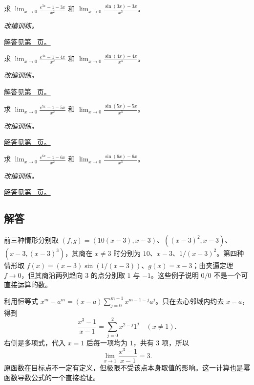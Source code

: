 \documentclass[UTF8,12pt,a4paper,fontset=fandol]{ctexart}
\begin{document}
\begin{example}[消去低阶项后的极限]\label{ex:c3q22}
求 $\displaystyle\lim_{x\to0}\frac{e^{3x}-1-3x}{x^2}$ 和 $\displaystyle\lim_{x\to0}\frac{\sin(3x)-3x}{x^3}$。
\par\textit{改编训练。}\par\hyperref[ans:c3q22]{解答见第~\pageref{ans:c3q22} 页。}
\end{example}
\begin{example}[消去低阶项后的极限]\label{ex:c3q23}
求 $\displaystyle\lim_{x\to0}\frac{e^{4x}-1-4x}{x^2}$ 和 $\displaystyle\lim_{x\to0}\frac{\sin(4x)-4x}{x^3}$。
\par\textit{改编训练。}\par\hyperref[ans:c3q23]{解答见第~\pageref{ans:c3q23} 页。}
\end{example}
\begin{example}[消去低阶项后的极限]\label{ex:c3q24}
求 $\displaystyle\lim_{x\to0}\frac{e^{5x}-1-5x}{x^2}$ 和 $\displaystyle\lim_{x\to0}\frac{\sin(5x)-5x}{x^3}$。
\par\textit{改编训练。}\par\hyperref[ans:c3q24]{解答见第~\pageref{ans:c3q24} 页。}
\end{example}
\begin{example}[消去低阶项后的极限]\label{ex:c3q25}
求 $\displaystyle\lim_{x\to0}\frac{e^{6x}-1-6x}{x^2}$ 和 $\displaystyle\lim_{x\to0}\frac{\sin(6x)-6x}{x^3}$。
\par\textit{改编训练。}\par\hyperref[ans:c3q25]{解答见第~\pageref{ans:c3q25} 页。}
\end{example}
\subsection{解答}
\begin{solve}\label{ans:c3q1}
前三种情形分别取 $(f,g)=(10(x-3),x-3)$、$((x-3)^2,x-3)$、$(x-3,(x-3)^3)$，其商在 $x\ne3$ 时分别为 $10$、$x-3$、$1/(x-3)^2$。第四种情形取 $f(x)=(x-3)\sin(1/(x-3))$、$g(x)=x-3$；由夹逼定理 $f\to0$，但其商沿两列趋向 $3$ 的点分别取 $1$ 与 $-1$。这些例子说明 $0/0$ 不是一个可直接运算的数。
\end{solve}

\begin{solve}\label{ans:c3q2}
利用恒等式 $x^m-a^m=(x-a)\sum_{j=0}^{m-1}x^{m-1-j}a^j$。只在去心邻域内约去 $x-a$，得到
\[
\frac{x^{3}-1}{x-1}=\sum_{j=0}^{2}x^{2-j}1^j\quad(x\ne 1).
\]
右侧是多项式，代入 $x=1$ 后每一项均为 $1$，共有 $3$ 项，所以
\[
\lim_{x\to 1}\frac{x^{3}-1}{x-1}=3.
\]
原函数在目标点不一定有定义，但极限不受该点本身取值的影响。这一计算也是幂函数导数公式的一个直接验证。
\end{solve}
\end{document}
